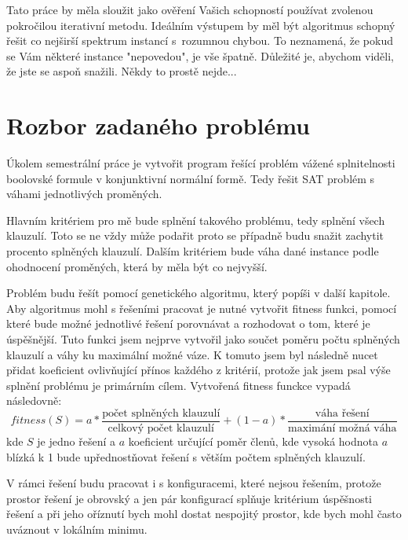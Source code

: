\documentclass[11pt]{article}
\begin{document}
Tato práce by měla sloužit jako ověření Vašich schopností používat zvolenou pokročilou iterativní metodu. Ideálním výstupem by měl být algoritmus schopný řešit co nejširší spektrum instancí s~rozumnou chybou. To neznamená, že pokud se Vám některé instance "nepovedou", je vše špatně. Důležité je, abychom viděli, že jste se aspoň snažili. Někdy to prostě nejde...

\section{Rozbor zadaného problému}\label{kap:rozbor}
Úkolem semestrální práce je vytvořit program řešící problém vážené splnitelnosti boolovské formule v konjunktivní normální formě. Tedy řešit SAT problém s váhami jednotlivých proměných. 

Hlavním kritériem pro mě bude splnění takového problému, tedy splnění všech klauzulí. Toto se ne vždy může podařit proto se případně budu snažit zachytit procento splněných klauzulí. Dalším kritériem bude váha dané instance podle ohodnocení proměných, která by měla být co nejvyšší. 

Problém budu řešít pomocí genetického algoritmu, který popíši v další kapitole. Aby algoritmus mohl s řešeními pracovat je nutné vytvořit fitness funkci, pomocí které bude možné jednotlivé řešení porovnávat a rozhodovat o tom, které je úspěšnější. Tuto funkci jsem nejprve vytvořil jako součet poměru počtu splněných klauzulí a váhy ku maximální možné váze. K tomuto jsem byl následně nucet přidat koeficient ovlivňující přínos každého z kritérií, protože jak jsem psal výše splnění problému je primárním cílem. Vytvořená fitness funckce vypadá následovně: 
$$ fitness(S) = a * \frac{\text{počet splněných klauzulí}}{\text{celkový počet klauzulí}} + (1 - a) * \frac{\text{váha řešení}}{\text{maximání možná váha}}$$
kde $S$ je jedno řešení a $a$ koeficient určující poměr členů, kde vysoká hodnota $a$ blízká k 1 bude upřednostňovat řešení s větším počtem splněných klauzulí.

V rámci řešení budu pracovat i s konfiguracemi, které nejsou řešením, protože prostor řešení je obrovský a jen pár konfigurací splňuje kritérium úspěšnosti řešení a při jeho oříznutí bych mohl dostat nespojitý prostor, kde bych mohl často uváznout v lokálním minimu.
\end{document}
